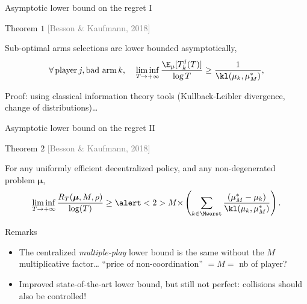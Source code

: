 \documentclass[12pt,english,ignorenonframetext,]{beamer}
\providecommand{\tightlist}{%
  \setlength{\itemsep}{0pt}\setlength{\parskip}{0pt}}
\begin{document}
\begin{frame}{Asymptotic lower bound on the regret I}

\begin{block}{Theorem $1$
  \hfill{}\textcolor{gray}{[Besson \& Kaufmann, 2018]}}

  Sub-optimal arms selections are lower bounded asymptotically,
  \[\forall\, \text{player}\, j, \text{bad arm}\,k,\;\;\;\; \mathop{\lim\inf}\limits_{T \to +\infty} \frac{\E_{\mu}[T_k^j(T)]}{\log T} \geq \frac{1}{\kl(\mu_k, \mu_M^*)},\]
\end{block}

Proof: using classical information theory tools (Kullback-Leibler divergence, change of distributions)\dots
{}

\end{frame}

\begin{frame}{Asymptotic lower bound on the regret II}

\begin{block}{Theorem $2$
\hfill{}\textcolor{gray}{[Besson \& Kaufmann, 2018]}}

\small{For any uniformly efficient decentralized policy, and any
non-degenerated problem \(\boldsymbol{\mu}\),} \vspace*{-10pt}
\[ \mathop{\lim\inf}\limits_{T \to +\infty} \frac{R_T(\boldsymbol{\mu}, M, \rho)}{\log(T)} \geq
\alert<2>{M \times} \left( \sum_{k \in \Mworst} \frac{(\mu_M^* -  \mu_k)}{\kl(\mu_k, \mu_M^*)} \right) . \]
\end{block}

\pause

\begin{block}{Remarks}

\begin{itemize}\tightlist
\item
  The centralized \emph{multiple-play} lower bound is the same without
  the \alert{\(M\) multiplicative factor}\ldots{}
  \hook \alert{``price of non-coordination''} \(= M =\) nb of player?
\item
  Improved state-of-the-art lower bound, but still not perfect:
  collisions should also be controlled!
\end{itemize}

\end{block}

\end{frame}
\end{document}
